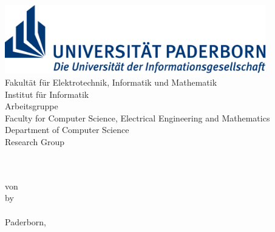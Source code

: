 \begin{titlepage}
	\begin{center}
		\begin{minipage}{135mm}
			\includegraphics[height=30mm]{figures/uni-logo}\\
			\ifgerman
				\textsf{
					\hspace*{20mm} Fakultät für Elektrotechnik,
					Informatik und Mathematik \\
					\hspace*{20mm} Institut für Informatik \\
					\hspace*{20mm} Arbeitsgruppe \theresearchgroup{} \\
				}
			\else
				\textsf{
					\hspace*{20mm} Faculty for Computer Science, 
					Electrical Engineering and Mathematics \\
					\hspace*{20mm} Department of Computer Science \\
					\hspace*{20mm} Research Group \theresearchgroup{} \\
				}
			\fi 
		\end{minipage}\\[40pt]


		{\Huge\textbf{\thetitle{}}}\\[30pt]

		\ifgerman
			von\\
		\else
			by\\
		\fi 
		{\Large\textsc{\theauthor{}}}\\[30pt]


		Paderborn, \thesubmissiondate{}
	\end{center}
\end{titlepage}
